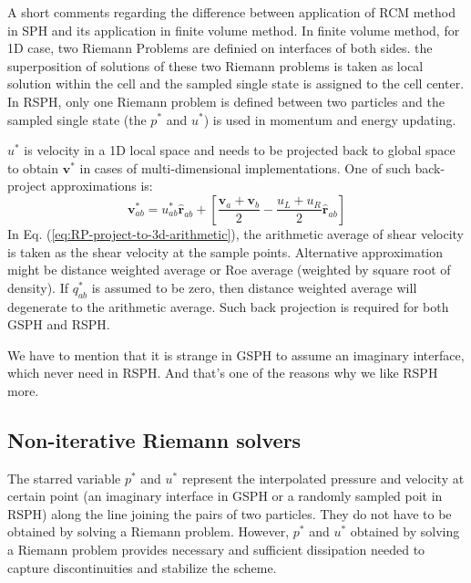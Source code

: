 A short comments regarding the difference between application of RCM method in SPH and its application in finite volume method. In finite volume method, for 1D case, two Riemann Problems are definied on interfaces of both sides. the superposition of solutions of these two Riemann problems is taken as local solution within the cell and the sampled single state is assigned to the cell center. In RSPH, only one Riemann problem is defined between two particles and the sampled single state (the $p^{\ast}$ and $u^{\ast}$) is used in momentum and energy updating.

$u^{\ast}$ is velocity in a 1D local space and needs to be projected back to global space to obtain $\textbf{v}^{\ast}$ in cases of multi-dimensional implementations. One of such back-project approximations is:
\begin{equation}
\textbf{v}^{\ast}_{a b}=u^{\ast}_{a b} \hat{\textbf{r}}_{a b} + \left [\frac{\textbf{v}_{a} + \textbf{v}_{b}}{2} - \frac{u_L + u_R}{2} \hat{\textbf{r}}_{a b}\right]
\label{eq:RP-project-to-3d-arithmetic}
\end{equation}
In Eq. (\ref{eq:RP-project-to-3d-arithmetic}), the arithmetic average of shear velocity is taken as the shear velocity at the sample points. Alternative approximation might be distance weighted average or Roe average (weighted by square root of density). If $q_{a b}^{\ast}$ is assumed to be zero, then distance weighted average will degenerate to the arithmetic average.
Such back projection is required for both GSPH and RSPH.

We have to mention that it is strange in GSPH to assume an imaginary interface, which never need in RSPH. And that's one of the reasons why we like RSPH more.

\subsection{Non-iterative Riemann solvers} \label{sec:RP-solver}
The starred variable $p^{\ast}$ and $u^{\ast}$ represent the interpolated pressure and velocity at certain point (an imaginary interface in GSPH or a randomly sampled poit in RSPH) along the line joining the pairs of two particles. They do not have to be obtained by solving a Riemann problem. However, $p^{\ast}$ and $u^{\ast}$ obtained by solving a Riemann problem provides necessary and sufficient dissipation needed to capture discontinuities and stabilize the scheme.

